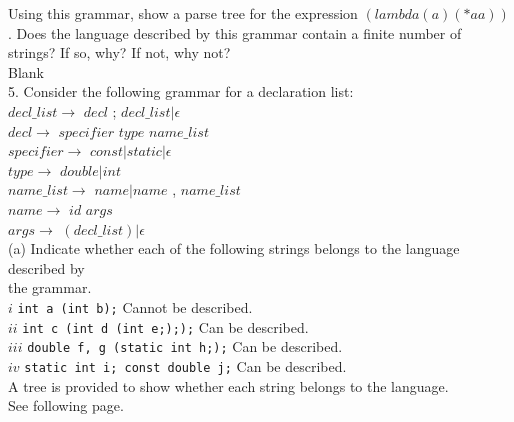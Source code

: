 \documentclass[12pt]{article}
\begin{document}
\begin{flushleft}
Using this grammar, show a parse tree for the expression $(lambda (a) (* a a))$.  Does the language described by this grammar contain a finite number of strings? If so, why? If not, why not?\\
[400mm]
 
 
 Blank\\
 [900mm]
 
 5. Consider the following grammar for a declaration list:\\ 
 [2mm]
 
 \qquad \qquad 	
 $decl\_list \rightarrow$ $decl$ ; $decl\_list \big| \epsilon$\\	
 \qquad \qquad 	
 $decl \rightarrow$ $specifier$ $type$ $name\_list$\\
 \qquad \qquad 	
 $specifier \rightarrow$ $const \big| static\big| \epsilon$\\
 \qquad \qquad 	
 $type \rightarrow$ $double\big| int$\\
 \qquad \qquad 	
 $name\_list \rightarrow$ $name \big| name$ , $name\_list$\\
 \qquad \qquad 	
 $name \rightarrow$ $id$ $args$\\
 \qquad \qquad 	
 $args \rightarrow$ $(decl\_list)\big| \epsilon$\\  
 [6mm]
 
 \qquad \qquad 
 (a) Indicate whether each of the following strings belongs to the language described by\\
 \qquad \qquad \quad \quad the grammar.\\
 [2mm]
 \qquad \qquad \qquad \qquad 
 $i$ \hspace{6.5mm} \texttt{int a (int b);} \hspace{40mm} Cannot be described.\\
 \qquad \qquad \qquad \qquad 
 $ii$ \hspace{5.5mm} \texttt{int c (int d (int e;););} \hspace{18mm} Can be described.\\
 \qquad \qquad \qquad \qquad 
 $iii$ \hspace{4mm} \texttt{double f, g (static int h;);} \hspace{10mm} Can be described.\\
 \qquad \qquad \qquad \qquad 
 $iv$ \hspace{5mm} \texttt{static int i; const double j;} \hspace{8mm} Can be described.\\
 [2mm]
 
 
 \qquad \qquad \quad \quad
 A tree is provided to show whether each string belongs to the language.\\
 \qquad \qquad \quad \quad
 See following page.\\
 [2mm] 
 

\end{flushleft}
\end{document}
